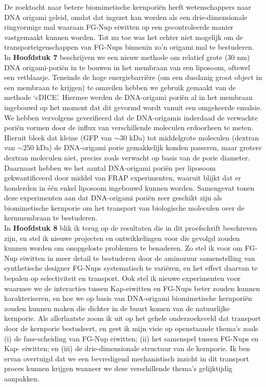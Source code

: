 {	\noindent De zoektocht naar betere biomimetische kernporiën heeft wetenschappers naar DNA origami geleid, omdat dat ingezet kan worden als een drie-dimensionale ringvormige mal waaraan FG-Nup eiwitten op een gecontroleerde manier vastgemaakt kunnen worden. Tot nu toe was het echter niet mogelijk om de transporteigenschappen van FG-Nups binnenin zo’n origami mal te bestuderen. In \textbf{Hoofdstuk 7} beschrijven we een nieuw methode om relatief grote (30 nm) DNA origami-pori\"{e}n in te bouwen in het membraan van een liposoom, oftewel een vetblaasje. Teneinde de hoge energiebarrière (om een dusdanig groot object in een membraan te krijgen) te omzeilen hebben we gebruik gemaakt van de methode `cDICE'. Hiermee werden de DNA-origami pori\"{e}n al in het membraan ingebouwd op het moment dat dit gevormd wordt vanuit een omgekeerde emulsie. We hebben vervolgens geverifieerd dat de DNA-origamis inderdaad de verwachte poriën vormen door de influx van verschillende moleculen erdoorheen te meten. Hieruit bleek dat kleine (GFP van $\sim$30 kDa) tot middelgrote moleculen (dextran van $\sim$250 kDa) de DNA-origami porie gemakkelijk konden passeren, maar grotere dextran moleculen niet, precies zoals verwacht op basis van de porie diameter. Daarnaast hebben we het aantal DNA-origami poriën per liposoom gekwantificeerd door middel van FRAP experimenten, waaruit blijkt dat er honderden in \'{e}\'{e}n enkel liposoom ingebouwd kunnen worden. Samengevat tonen deze experimenten aan dat DNA-origami poriën zeer geschikt zijn als biomimetische kernporie om het transport van biologische moleculen over de kernmembraan te bestuderen.\\[0.5pt]
	
	\noindent In \textbf{Hoofdstuk 8} blik ik terug op de resultaten die in dit proefschrift beschreven zijn, en stel ik nieuwe projecten en ontwikkelingen voor die gevolgd zouden kunnen worden om onopgeloste problemen te benaderen. Zo stel ik voor om FG-Nup eiwitten in meer detail te bestuderen door de aminozuur samenstelling van synthetische designer FG-Nups systematisch te variëren, en het effect daarvan te bepalen op selectiviteit en transport. Ook stel ik nieuwe experimenten voor waarmee we de interacties tussen Kap-eiwitten en FG-Nups beter zouden kunnen karakteriseren, en hoe we op basis van DNA-origami biomimetische kernporiën zouden kunnen maken die dichter in de buurt komen van de natuurlijke kernporie. Als allerlaatste zoom ik uit op het gehele onderzoeksveld dat transport door de kernporie bestudeert, en geet ik mijn visie op openstaande thema’s zoals (i) de fase-scheiding van FG-Nup eiwitten; (ii) het samenspel tussen FG-Nups en Kap- eiwitten; en (iii) de drie-dimensionale structuur van de kernporie. Ik ben ervan overtuigd dat we een bevredigend mechanistisch inzicht in dit transport proces kunnen krijgen wanneer we deze verschillende thema’s gelijktijdig aanpakken.
	
}

